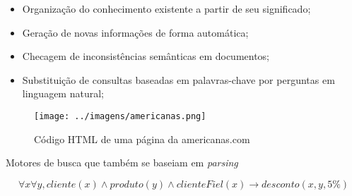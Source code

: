 

\begin{itemize}
\item Organização do conhecimento existente a partir de seu significado;
\item Geração de novas informações de forma automática;
\item Checagem de inconsistências semânticas em documentos;
\item Substituição de consultas baseadas em palavras-chave por perguntas em linguagem natural; 
\end{itemize}

\begin{figure}
\texttt{[image: ../imagens/americanas.png]}
\caption{Código HTML de uma página da americanas.com}
\label{fig:americanas}
\end{figure}

Motores de busca que também se baseiam em \textit{parsing} 

\[
\forall x \forall y, cliente(x) \land produto(y) \land clienteFiel(x) \rightarrow desconto(x, y, 5\%)
\]

